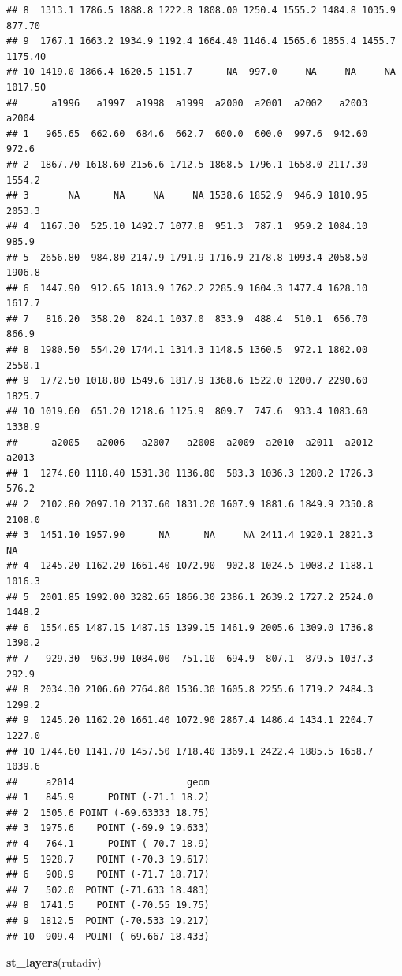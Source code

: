 \documentclass[11pt,]{article}
\newenvironment{Shaded}{\begin{snugshade}}{\end{snugshade}}
\newcommand{\KeywordTok}[1]{\textcolor[rgb]{0.13,0.29,0.53}{\textbf{#1}}}
\newcommand{\NormalTok}[1]{#1}
\begin{document}
\begin{verbatim}
## 8  1313.1 1786.5 1888.8 1222.8 1808.00 1250.4 1555.2 1484.8 1035.9  877.70
## 9  1767.1 1663.2 1934.9 1192.4 1664.40 1146.4 1565.6 1855.4 1455.7 1175.40
## 10 1419.0 1866.4 1620.5 1151.7      NA  997.0     NA     NA     NA 1017.50
##      a1996   a1997  a1998  a1999  a2000  a2001  a2002   a2003  a2004
## 1   965.65  662.60  684.6  662.7  600.0  600.0  997.6  942.60  972.6
## 2  1867.70 1618.60 2156.6 1712.5 1868.5 1796.1 1658.0 2117.30 1554.2
## 3       NA      NA     NA     NA 1538.6 1852.9  946.9 1810.95 2053.3
## 4  1167.30  525.10 1492.7 1077.8  951.3  787.1  959.2 1084.10  985.9
## 5  2656.80  984.80 2147.9 1791.9 1716.9 2178.8 1093.4 2058.50 1906.8
## 6  1447.90  912.65 1813.9 1762.2 2285.9 1604.3 1477.4 1628.10 1617.7
## 7   816.20  358.20  824.1 1037.0  833.9  488.4  510.1  656.70  866.9
## 8  1980.50  554.20 1744.1 1314.3 1148.5 1360.5  972.1 1802.00 2550.1
## 9  1772.50 1018.80 1549.6 1817.9 1368.6 1522.0 1200.7 2290.60 1825.7
## 10 1019.60  651.20 1218.6 1125.9  809.7  747.6  933.4 1083.60 1338.9
##      a2005   a2006   a2007   a2008  a2009  a2010  a2011  a2012  a2013
## 1  1274.60 1118.40 1531.30 1136.80  583.3 1036.3 1280.2 1726.3  576.2
## 2  2102.80 2097.10 2137.60 1831.20 1607.9 1881.6 1849.9 2350.8 2108.0
## 3  1451.10 1957.90      NA      NA     NA 2411.4 1920.1 2821.3     NA
## 4  1245.20 1162.20 1661.40 1072.90  902.8 1024.5 1008.2 1188.1 1016.3
## 5  2001.85 1992.00 3282.65 1866.30 2386.1 2639.2 1727.2 2524.0 1448.2
## 6  1554.65 1487.15 1487.15 1399.15 1461.9 2005.6 1309.0 1736.8 1390.2
## 7   929.30  963.90 1084.00  751.10  694.9  807.1  879.5 1037.3  292.9
## 8  2034.30 2106.60 2764.80 1536.30 1605.8 2255.6 1719.2 2484.3 1299.2
## 9  1245.20 1162.20 1661.40 1072.90 2867.4 1486.4 1434.1 2204.7 1227.0
## 10 1744.60 1141.70 1457.50 1718.40 1369.1 2422.4 1885.5 1658.7 1039.6
##     a2014                    geom
## 1   845.9      POINT (-71.1 18.2)
## 2  1505.6 POINT (-69.63333 18.75)
## 3  1975.6    POINT (-69.9 19.633)
## 4   764.1      POINT (-70.7 18.9)
## 5  1928.7    POINT (-70.3 19.617)
## 6   908.9    POINT (-71.7 18.717)
## 7   502.0  POINT (-71.633 18.483)
## 8  1741.5    POINT (-70.55 19.75)
## 9  1812.5  POINT (-70.533 19.217)
## 10  909.4  POINT (-69.667 18.433)
\end{verbatim}

\begin{Shaded}
\begin{Highlighting}[]
\KeywordTok{st_layers}\NormalTok{(rutadiv)}
\end{Highlighting}
\end{Shaded}
\end{document}

